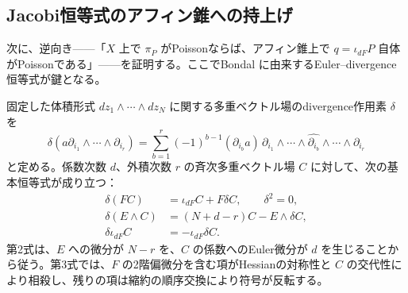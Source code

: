 \subsection{Jacobi恒等式のアフィン錐への持上げ}
次に、逆向き——「$X$ 上で $\pi_P$ がPoissonならば、アフィン錐上で $q=\iota_{dF}P$ 自体がPoissonである」——を証明する。ここでBondal \cite[\S4, pp.~11--12]{PBondal93} に由来するEuler--divergence恒等式が鍵となる。

固定した体積形式 $dz_1\wedge\cdots\wedge dz_N$ に関する多重ベクトル場のdivergence作用素 $\delta$ を
\begin{equation}\label{eq:pg-divergence-definition}
\delta(a\partial_{i_1}\wedge\cdots\wedge\partial_{i_r})
=\sum_{b=1}^r(-1)^{b-1}(\partial_{i_b}a)\,
\partial_{i_1}\wedge\cdots\wedge\widehat{\partial_{i_b}}\wedge\cdots
\wedge\partial_{i_r}
\end{equation}
と定める。係数次数 $d$、外積次数 $r$ の斉次多重ベクトル場 $C$ に対して、次の基本恒等式が成り立つ：
\begin{equation}\label{eq:pg-divergence-identities}
\begin{aligned}
\delta(FC)&=\iota_{dF}C+F\delta C,\qquad \delta^2=0,\\
\delta(E\wedge C)&=(N+d-r)C-E\wedge\delta C,\\
\delta\iota_{dF}C&=-\iota_{dF}\delta C.
\end{aligned}
\end{equation}
第2式は、$E$ への微分が $N-r$ を、$C$ の係数へのEuler微分が $d$ を生じることから従う。第3式では、$F$ の2階偏微分を含む項がHessianの対称性と $C$ の交代性により相殺し、残りの項は縮約の順序交換により符号が反転する。

